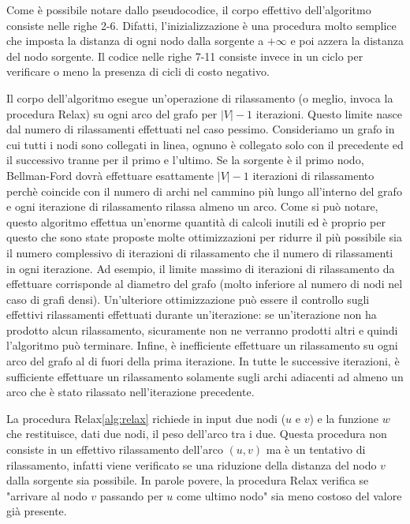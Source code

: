 \documentclass[a4paper]{article}
\begin{document}
	Come è possibile notare dallo pseudocodice, il corpo effettivo dell'algoritmo consiste nelle righe 2-6. Difatti, l'inizializzazione è una procedura molto semplice che imposta la distanza di ogni nodo dalla sorgente a $+\infty$ e poi azzera la distanza del nodo sorgente. Il codice nelle righe 7-11 consiste invece in un ciclo per verificare o meno la presenza di cicli di costo negativo.
	
	Il corpo dell'algoritmo esegue un'operazione di rilassamento (o meglio, invoca la procedura Relax) su ogni arco del grafo per $|V|-1$ iterazioni. Questo limite nasce dal numero di rilassamenti effettuati nel caso pessimo. Consideriamo un grafo in cui tutti i nodi sono collegati in linea, ognuno è collegato solo con il precedente ed il successivo tranne per il primo e l'ultimo. Se la sorgente è il primo nodo, Bellman-Ford dovrà effettuare esattamente $|V|-1$ iterazioni di rilassamento perchè coincide con il numero di archi nel cammino più lungo all'interno del grafo e ogni iterazione di rilassamento rilassa almeno un arco. Come si può notare, questo algoritmo effettua un'enorme quantità di calcoli inutili ed è proprio per questo che sono state proposte molte ottimizzazioni per ridurre il più possibile sia il numero complessivo di iterazioni di rilassamento che il numero di rilassamenti in ogni iterazione. Ad esempio, il limite massimo di iterazioni di rilassamento da effettuare corrisponde al diametro del grafo (molto inferiore al numero di nodi nel caso di grafi densi). Un'ulteriore ottimizzazione può essere il controllo sugli effettivi rilassamenti effettuati durante un'iterazione: se un'iterazione non ha prodotto alcun rilassamento, sicuramente non ne verranno prodotti altri e quindi l'algoritmo può terminare. Infine, è inefficiente effettuare un rilassamento su ogni arco del grafo al di fuori della prima iterazione. In tutte le successive iterazioni, è sufficiente effettuare un rilassamento solamente sugli archi adiacenti ad almeno un arco che è stato rilassato nell'iterazione precedente.
	
	La procedura Relax\ref{alg:relax} richiede in input due nodi ($u$ e $v$) e la funzione $w$ che restituisce, dati due nodi, il peso dell'arco tra i due. Questa procedura non consiste in un effettivo rilassamento dell'arco $(u,v)$ ma è un tentativo di rilassamento, infatti viene verificato se una riduzione della distanza del nodo $v$ dalla sorgente sia possibile. In parole povere, la procedura Relax verifica se "arrivare al nodo $v$ passando per $u$ come ultimo nodo" sia meno costoso del valore già presente.
	
\end{document}
